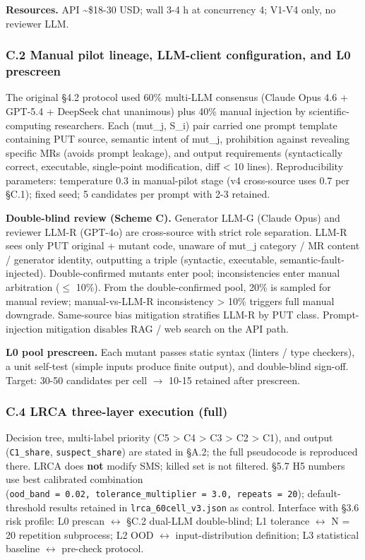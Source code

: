\documentclass[review,12pt,authoryear]{elsarticle}
\begin{document}
\textbf{Resources.} API \textasciitilde\$18-30 USD; wall 3-4 h at
concurrency 4; V1-V4 only, no reviewer LLM.

\subsubsection{C.2 Manual pilot lineage, LLM-client configuration, and
L0
prescreen}\label{c.2-manual-pilot-lineage-llm-client-configuration-and-l0-prescreen}

The original §4.2 protocol used 60\% multi-LLM consensus (Claude Opus
4.6 + GPT-5.4 + DeepSeek chat unanimous) plus 40\% manual injection by
scientific-computing researchers. Each (mut\_j, S\_i) pair carried one
prompt template containing PUT source, semantic intent of mut\_j,
prohibition against revealing specific MRs (avoids prompt leakage), and
output requirements (syntactically correct, executable, single-point
modification, diff \textless{} 10 lines). Reproducibility parameters:
temperature 0.3 in manual-pilot stage (v4 cross-source uses 0.7 per
§C.1); fixed seed; 5 candidates per prompt with 2-3 retained.

\textbf{Double-blind review (Scheme C).} Generator LLM-G (Claude Opus)
and reviewer LLM-R (GPT-4o) are cross-source with strict role
separation. LLM-R sees only PUT original + mutant code, unaware of
mut\_j category / MR content / generator identity, outputting a triple
(syntactic, executable, semantic-fault-injected). Double-confirmed
mutants enter pool; inconsistencies enter manual arbitration ($\leq$ 10\%).
From the double-confirmed pool, 20\% is sampled for manual review;
manual-vs-LLM-R inconsistency \textgreater{} 10\% triggers full manual
downgrade. Same-source bias mitigation stratifies LLM-R by PUT class.
Prompt-injection mitigation disables RAG / web search on the API path.

\textbf{L0 pool prescreen.} Each mutant passes static syntax (linters /
type checkers), a unit self-test (simple inputs produce finite output),
and double-blind sign-off. Target: 30-50 candidates per cell $\to$ 10-15
retained after prescreen.

\subsubsection{C.4 LRCA three-layer execution
(full)}\label{c.4-lrca-three-layer-execution-full}

Decision tree, multi-label priority (C5 \textgreater{} C4 \textgreater{}
C3 \textgreater{} C2 \textgreater{} C1), and output (\texttt{C1\_share},
\texttt{suspect\_share}) are stated in §A.2; the full pseudocode is
reproduced there. LRCA does \textbf{not} modify SMS; killed set is not
filtered. §5.7 H5 numbers use best calibrated combination
(\texttt{ood\_band\ =\ 0.02,\ tolerance\_multiplier\ =\ 3.0,\ repeats\ =\ 20});
default-threshold results retained in \texttt{lrca\_60cell\_v3.json} as
control. Interface with §3.6 risk profile: L0 prescan $\leftrightarrow$ §C.2 dual-LLM
double-blind; L1 tolerance $\leftrightarrow$ N = 20 repetition subprocess; L2 OOD $\leftrightarrow$
input-distribution definition; L3 statistical baseline $\leftrightarrow$ pre-check
protocol.
\end{document}
